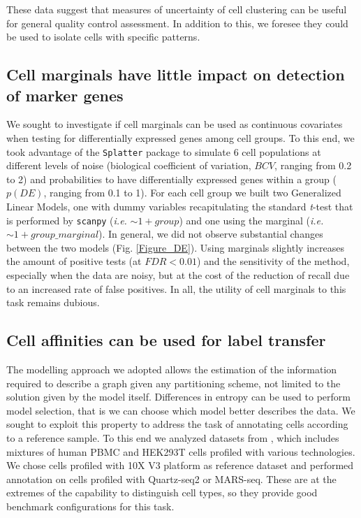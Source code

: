 \documentclass[10pt]{article}
\begin{document}
These data suggest that measures of uncertainty of cell clustering can be useful for general quality control assessment. In addition to this, we foresee they could be used to isolate cells with specific patterns.

\subsection*{Cell marginals have little impact on detection of marker genes}

We sought to investigate if cell marginals can be used as continuous covariates when testing for differentially expressed genes among cell groups. To this end, we took advantage of the \texttt{Splatter} package \cite{Zappia_Oshlack_2017} to simulate 6 cell populations at different levels of noise (biological coefficient of variation, $BCV$, ranging from 0.2 to 2) and probabilities to have differentially expressed genes within a group ($p(DE)$, ranging from 0.1 to 1). For each cell group we built two Generalized Linear Models, one with dummy variables recapitulating the standard \emph{t}-test that is performed by \texttt{scanpy} (\emph{i.e.} $\sim1 + group$) and one using the marginal (\emph{i.e.} $\sim1 + group\_marginal$). In general, we did not observe substantial changes between the two models (Fig. \ref{Figure_DE}). Using marginals slightly increases the amount of positive tests (at $FDR<0.01$) and the sensitivity of the method, especially when the data are noisy, but at the cost of the reduction of recall due to an increased rate of false positives. In all, the utility of cell marginals to this task remains dubious.

\subsection*{Cell affinities can be used for label transfer}

The modelling approach we adopted allows the estimation of the information required to describe a graph given any partitioning scheme, not limited to the solution given by the model itself. Differences in entropy can be used to perform model selection, that is we can choose which model better describes the data. We sought to exploit this property to address the task of annotating cells according to a reference sample. To this end we analyzed datasets from \cite{mereu_2020}, which includes mixtures of human PBMC and HEK293T cells profiled with various technologies. We chose cells profiled with 10X V3 platform as reference dataset and performed annotation on cells profiled with Quartz-seq2 or MARS-seq. These are at the extremes of the capability to distinguish cell types, so they provide good benchmark configurations for this task. 
\end{document}
